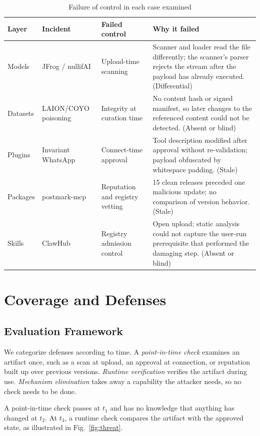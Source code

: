 \documentclass[conference]{IEEEtran}
\begin{document}
\begin{table}[!t]
\caption{Failure of control in each case examined}
\label{tab:incidents}
\centering
\footnotesize
\renewcommand{\arraystretch}{1.2}
\begin{tabular}{L{1.8cm}L{3.0cm}L{3.4cm}L{7.2cm}}
\hline\hline
\textbf{Layer} & \textbf{Incident} & \textbf{Failed control} & \textbf{Why it failed}\\
\hline
Models & JFrog / nullifAI & Upload-time scanning & Scanner and loader read the file differently; the scanner's parser rejects the stream after the payload has already executed. (Differential)\\
Datasets & LAION/COYO poisoning & Integrity at curation time & No content hash or signed manifest, so later changes to the referenced content could not be detected. (Absent or blind)\\
Plugins & Invariant WhatsApp & Connect-time approval & Tool description modified after approval without re-validation; payload obfuscated by whitespace padding. (Stale)\\
Packages & postmark-mcp & Reputation and registry vetting & 15 clean releases preceded one malicious update; no comparison of version behavior. (Stale)\\
Skills & ClawHub & Registry admission control & Open upload; static analysis could not capture the user-run prerequisite that performed the damaging step. (Absent or blind)\\
\hline
\end{tabular}
\end{table}

\section{Coverage and Defenses}
\label{sec:defenses}

\subsection{Evaluation Framework}
\label{sec:def-frame}

We categorize defenses according to time. A \emph{point-in-time check} examines an artifact once, such as a scan at upload, an approval at connection, or reputation built up over previous versions. \emph{Runtime verification} verifies the artifact during use. \emph{Mechanism elimination} takes away a capability the attacker needs, so no check needs to be done.

A point-in-time check passes at $t_1$ and has no knowledge that anything has changed at $t_2$. At $t_3$, a runtime check compares the artifact with the approved state, as illustrated in Fig.~\ref{fig:threat}.
\end{document}

